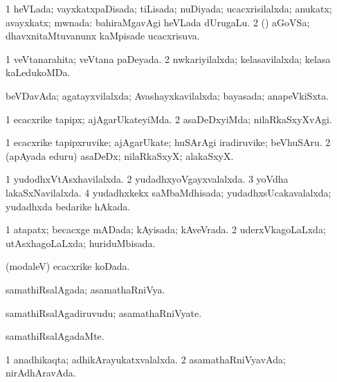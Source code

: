 \bentry
{} 
\gl{\gu}
\expl{}
\bmng
\bnum
\num{1} heVLada; vayxkatxpaDisada; tiLisada; nuDiyada; ucacxrisilalxda; anukatx; avayxkatx; mwnada:  bahiraMgavAgi heVLada dUrugaLu. 
\num{2} (\BAshA) aGoVSa; dhavxnitaMtuvanunx kaMpisade ucacxrisuva. 
\enum
\emng
\eentry

\bentry
{} 
\gl{\gu}
\expl{}
\bmng
\bnum
\num{1} veVtanarahita; veVtana paDeyada. 
\num{2} nwkariyilalxda; kelasavilalxda; kelasa kaLedukoMDa. 
\enum
\emng
\eentry

\bentry
{} 
\gl{\gu}
\expl{}
\bmng
beVDavAda; agatayxvilalxda; Avashayxkavilalxda; bayasada; anapeVkiSxta. 
\emng
\eentry

\bentry
{} 
\gl{\kirxvi}
\expl{}
\bmng
\bnum
\num{1} ecacxrike tapipx; ajAgarUkateyiMda. 
\num{2} asaDeDxyiMda; nilaRkaSxyXvAgi. 
\enum
\emng
\eentry

\bentry
{} 
\gl{\nA}
\expl{}
\bmng
\bnum
\num{1} ecacxrike tapipxruvike; ajAgarUkate; huSArAgi iradiruvike; beVhuSAru. 
\num{2} (apAyada eduru) asaDeDx; nilaRkaSxyX; alakaSxyX. 
\enum
\emng
\eentry

\bentry
{} 
\gl{\gu}
\expl{}
\bmng
\bnum
\num{1} yudodhxVtAsxhavilalxda. 
\num{2} yudadhxyoVgayxvalalxda. 
\num{3} yoVdha lakaSxNavilalxda. 
\num{4} yudadhxkekx saMbaMdhisada; yudadhxsUcakavalalxda; yudadhxda bedarike hAkada. 
\enum
\emng
\eentry

\bentry
{} 
\gl{\gu}
\expl{}
\bmng
\bnum
\num{1} atapatx; becacxge mADada; kAyisada; kAveVrada. 
\num{2} uderxVkagoLaLxda; utAsxhagoLaLxda; huriduMbisada. 
\enum
\emng
\eentry

\bentry
{} 
\gl{\gu}
\expl{}
\bmng
(modaleV) ecacxrike koDada. 
\emng
\eentry

\bentry
{} 
\gl{\gu}
\expl{}
\bmng
samathiRsalAgada; asamathaRniVya. 
\emng
\eentry

\bentry
{} 
\gl{\nA}
\expl{}
\bmng
samathiRsalAgadiruvudu; asamathaRniVyate. 
\emng
\eentry

\bentry
{} 
\gl{\kirxvi}
\expl{}
\bmng
samathiRsalAgadaMte. 
\emng
\eentry

\bentry
{} 
\gl{\gu}
\expl{}
\bmng
\bnum
\num{1} anadhikaqta; adhikArayukatxvalalxda. 
\num{2} asamathaRniVyavAda; nirAdhAravAda. 
\enum
\emng
\eentry

